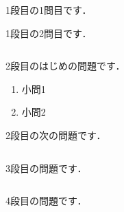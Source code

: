 \documentclass[b4paper,landscape,fleqn]{jarticle}
\begin{document}
%
%
%
%
\begin{sheet}%
  \begin{column}%
    \item 1段目の1問目です．\vspace{10cm}%
    \item 1段目の2問目です．%
  \end{column}%
  \begin{column}%
    \item 2段目のはじめの問題です．
        \begin{enumerate}%
            \item 小問1 \vspace{4.5cm}%
            \item 小問2 \vspace{4.5cm}
        \end{enumerate}
    \item 2段目の次の問題です．
  \end{column}%
  \begin{column}%
    \item 3段目の問題です．
  \end{column}%
  \begin{column}%
    \item 4段目の問題です．
  \end{column}%
\end{sheet}%
\end{document}
